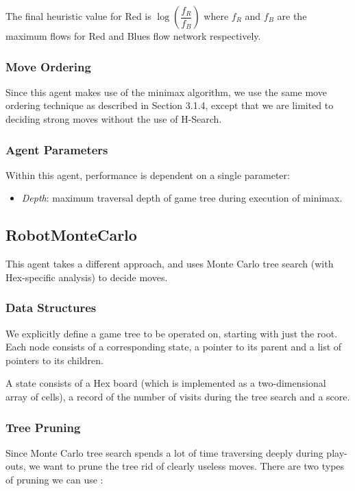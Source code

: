 The final heuristic value for Red is $\log{(\dfrac{f_R}{f_B})}$ where $f_R$ and $f_B$ are the maximum flows for Red and Blues flow network respectively.


\subsubsection{Move Ordering}

Since this agent makes use of the minimax algorithm, we use the same move ordering technique as described in Section 3.1.4, except that we are limited to deciding strong moves without the use of H-Search.

\subsubsection{Agent Parameters}
Within this agent, performance is dependent on a single parameter:

\begin{itemize}
    \item \textit{Depth}: maximum traversal depth of game tree during execution of minimax.
\end{itemize}


\subsection{RobotMonteCarlo}

This agent takes a different approach, and uses Monte Carlo tree search (with Hex-specific analysis) to decide moves.

\subsubsection{Data Structures}
We explicitly define a game tree to be operated on, starting with just the root. Each node consists of a corresponding state, a pointer to its parent and a list of pointers to its children. 

A state consists of a Hex board (which is implemented as a two-dimensional array of cells), a record of the number of visits during the tree search and a score.

\subsubsection{Tree Pruning}

Since Monte Carlo tree search spends a lot of time traversing deeply during play-outs, we want to prune the tree rid of clearly useless moves. There are two types of pruning we can use \cite{MCTSHex}:

